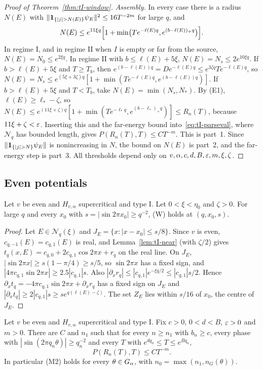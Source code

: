 \begin{proof}[Proof of Theorem~\ref{thm:tI-window}]
\emph{Assembly.} In every case there is a radius $N(E)$ with $\|\un_{\{|j|>N(E)\}}\psi_E\|^2\le16T^{-2m}$ for large $q$, and
\[
N(E)\le e^{11\xi q}\Bigl[1+\min\bigl(Te^{-\ell(E)q},e^{(b-\ell(E))_+q}\bigr)\Bigr].
\]
In regime I, and in regime II when $I$ is empty or far from the source, $N(E)=N_0\le e^{2\xi q}$. In regime II with $b\le\ell(E)+5\xi$, $N(E)=N_s\le2e^{10\xi q}$. If $b>\ell(E)+5\xi$ and $T\ge T_b$, then $e^{(b-\ell(E))q}=De^{-\ell(E)q}\le e^{3\zeta q}Te^{-\ell(E)q}$, so $N(E)=N_s\le e^{(5\xi+3\zeta)q}[1+\min(Te^{-\ell(E)q},e^{(b-\ell(E))q})]$. If $b>\ell(E)+5\xi$ and $T<T_b$, take $N(E)=\min(N_s,N_*)$. By (E1), $\ell(E)\ge\ell_*-\zeta$, so $N(E)\le e^{(11\xi+\zeta)q}[1+\min(Te^{-\ell_*q},e^{(b-\ell_*)_+q})]\le R_n(T)$, because $11\xi+\zeta<\varepsilon$. Inserting this and the far-energy bound into~\eqref{eq:tI-parseval}, where $\mathcal N_q$ has bounded length, gives $P(R_n(T),T)\le CT^{-m}$. This is part~1. Since $\|\un_{\{|j|>N\}}\psi_E\|$ is nonincreasing in $N$, the bound on $N(E)$ is part~2, and the far-energy step is part~3. All thresholds depend only on $v,\alpha,c,d,B,\varepsilon,m,\xi,\zeta$.
\end{proof}

\subsection{Even potentials}\label{sec:tI-even}

\begin{lemma}\label{lem:tI-Weven}
Let $v$ be even and $H_{v,\alpha}$ supercritical and type I. Let $0<\xi<\eta_0$ and $\zeta>0$. For large $q$ and every $x_0$ with $s=|\sin2\pi x_0|\ge q^{-2}$, (W) holds at $(q,x_0,s)$.
\end{lemma}

\begin{proof}
Let $E\in\mathcal N_q(\xi)$ and $J_E=\{x:|x-x_0|\le s/8\}$. Since $v$ is even, $c_{q,-1}(E)=c_{q,1}(E)$ is real, and Lemma~\ref{lem:tI-near} (with $\zeta/2$) gives $t_q(x,E)=c_{q,0}+2c_{q,1}\cos2\pi x+r_q$ on the real line. On $J_E$, $|\sin2\pi x|\ge s(1-\pi/4)\ge s/5$, so $\sin2\pi x$ has a fixed sign, and $|4\pi c_{q,1}\sin2\pi x|\ge2.5|c_{q,1}|s$. Also $|\partial_xr_q|\le|c_{q,1}|e^{-\xi q/2}\le|c_{q,1}|s/2$. Hence $\partial_xt_q=-4\pi c_{q,1}\sin2\pi x+\partial_xr_q$ has a fixed sign on $J_E$ and $|\partial_xt_q|\ge2|c_{q,1}|s\ge se^{q(\ell(E)-\zeta)}$. The set $Z_E$ lies within $s/16$ of $x_0$, the centre of $J_E$.
\end{proof}

\begin{theorem}\label{thm:tI-M2even}
Let $v$ be even and $H_{v,\alpha}$ supercritical and type I. Fix $c>0$, $0<d<B$, $\varepsilon>0$ and $m>0$. There are $C$ and $n_1$ such that for every $n\ge n_1$ with $b_n\ge c$, every phase with $|\sin(2\pi q_n\theta)|\ge q_n^{-2}$ and every $T$ with $e^{dq_n}\le T\le e^{Bq_n}$,
\[
P(R_n(T),T)\le CT^{-m}.
\]
In particular (M2) holds for every $\theta\in G_\alpha$, with $n_0=\max(n_1,n_G(\theta))$.
\end{theorem}

